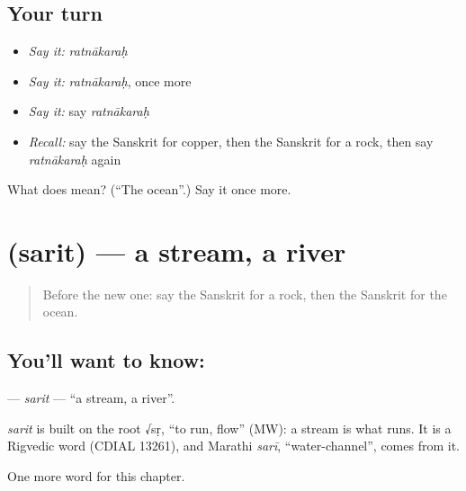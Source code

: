 \subsection*{Your turn}
\begin{itemize}
\raggedright
  \item \emph{Say it:} \emph{ratnākaraḥ}
  \item \emph{Say it:} \emph{ratnākaraḥ}, once more
  \item \emph{Say it:} say \emph{ratnākaraḥ}
  \item \emph{Recall:} say the Sanskrit for copper, then the Sanskrit for a rock, then say \emph{ratnākaraḥ} again
\end{itemize}

\begin{tcolorbox}[breakable,colback=teal!4,colframe=teal!35!black,title={Before you move on}]
What does  mean? (\textquotedblleft{}The ocean\textquotedblright{}.) Say it once more.
\end{tcolorbox}
\section[\texorpdfstring{\sk{सरित्} (sarit)}{सरित् (sarit)}]{ (sarit) — a stream, a river}

\label{lesson:SA-C196-sarit}



\begin{quote}
Before the new one: say the Sanskrit for a rock, then the Sanskrit for the ocean.
\end{quote}

\subsection*{You'll want to know: }
\textbf{} — \emph{sarit} — \textquotedblleft{}a stream, a river\textquotedblright{}.

\begin{cousinweb}
\emph{sarit} is built on the root √sṛ, \textquotedblleft{}to run, flow\textquotedblright{} (MW): a stream is what runs. It is a Rigvedic word (CDIAL 13261), and Marathi \emph{sarī}, \textquotedblleft{}water-channel\textquotedblright{}, comes from it.
\end{cousinweb}

\begin{grammarlens}[title={What you've built}]
One more word for this chapter.
\end{grammarlens}

